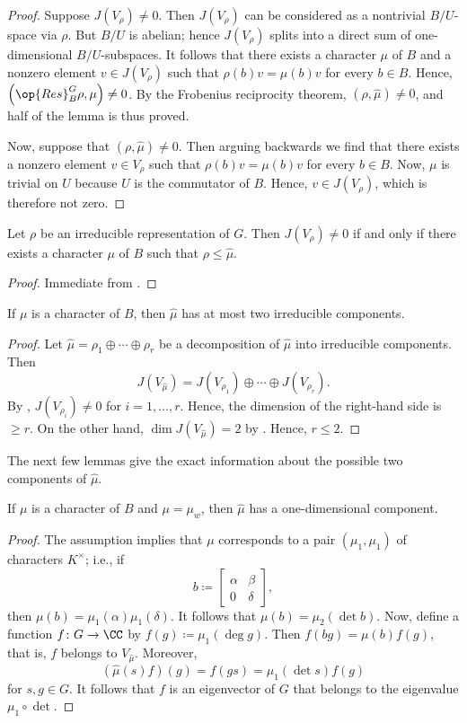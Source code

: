 \documentclass[../main.tex]{subfiles}
\begin{document}
\begin{proof}
	Suppose $J(V_\rho)\ne0$. Then $J(V_\rho)$ can be considered as a nontrivial $B/U$-space via $\rho$. But $B/U$ is abelian; hence $J(V_\rho)$ splits into a direct sum of one-dimensional $B/U$-subspaces. It follows that there exists a character $\mu$ of $B$ and a nonzero element $v\in J(V_\rho)$ such that $\rho(b)v=\mu(b)v$ for every $b\in B$. Hence, $\left(\op{Res}^G_B\rho,\mu\right)\ne0$. By the Frobenius reciprocity theorem, $(\rho,\widehat\mu)\ne0$, and half of the lemma is thus proved.

	Now, suppose that $(\rho,\widehat\mu)\ne0$. Then arguing backwards we find that there exists a nonzero element $v\in V_\rho$ such that $\rho(b)v=\mu(b)v$ for every $b\in B$. Now, $\mu$ is trivial on $U$ because $U$ is the commutator of $B$. Hence, $v\in J(V_\rho)$, which is therefore not zero.
\end{proof}
\begin{corollary} \label{cor:irred-use-of-jac}
	Let $\rho$ be an irreducible representation of $G$. Then $J(V_\rho)\ne0$ if and only if there exists a character $\mu$ of $B$ such that $\rho\le\widehat\mu$.
\end{corollary}
\begin{proof}
	Immediate from .
\end{proof}
\begin{corollary} \label{cor:mu-hat-decomp}
	If $\mu$ is a character of $B$, then $\widehat\mu$ has at most two irreducible components.
\end{corollary}
\begin{proof}
	Let $\widehat\mu=\rho_1\oplus\cdots\oplus\rho_r$ be a decomposition of $\widehat\mu$ into irreducible components. Then
	\[J(V_{\widehat\mu})=J\left(V_{\rho_1}\right)\oplus\cdots\oplus J\left(V_{\rho_r}\right).\]
	By , $J\left(V_{\rho_i}\right)\ne0$ for $i=1,\ldots,r$. Hence, the dimension of the right-hand side is $\ge r$. On the other hand, $\dim J\left(V_{\widehat\mu}\right)=2$ by . Hence, $r\le2$.
\end{proof}
The next few lemmas give the exact information about the possible two components of $\widehat\mu$.
\begin{lemma} \label{lem:to-reducible}
	If $\mu$ is a character of $B$ and $\mu=\mu_w$, then $\widehat\mu$ has a one-dimensional component.
\end{lemma}
\begin{proof}
	The assumption implies that $\mu$ corresponds to a pair $(\mu_1,\mu_1)$ of characters $K^\times$; i.e., if
	\[b\coloneqq\begin{bmatrix}
		\alpha & \beta \\
		0 & \delta
	\end{bmatrix},\]
	then $\mu(b)=\mu_1(\alpha)\mu_1(\delta)$. It follows that $\mu(b)=\mu_2(\det b)$. Now, define a function $f\colon G\to\CC$ by $f(g)\coloneqq\mu_1(\deg g)$. Then $f(bg)=\mu(b)f(g)$, that is, $f$ belongs to $V_{\widehat\mu}$. Moreover,
	\[\left(\widehat\mu(s)f\right)(g)=f(gs)=\mu_1(\det s)f(g)\]
	for $s,g\in G$. It follows that $f$ is an eigenvector of $G$ that belongs to the eigenvalue $\mu_1\circ\det$.
\end{proof}
\end{document}
